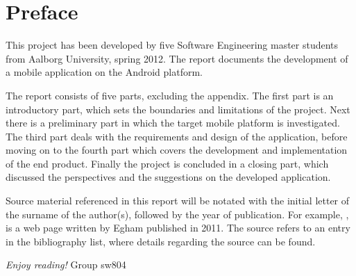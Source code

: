 \newpage
\thispagestyle{empty}
\mbox{}

\chapter*{Preface}
This project has been developed by five Software Engineering master students from Aalborg University, spring 2012. The report documents the development of a mobile application on the Android platform. 

\vspace{4mm}
\noindent The report consists of five parts, excluding the appendix. The first part is an introductory part, which sets the boundaries and limitations of the project. Next there is a preliminary part in which the target mobile platform is investigated. The third part deals with the requirements and design of the application, before moving on to the fourth part which covers the development and implementation of the end product. Finally the project is concluded in a closing part, which discussed the perspectives and the suggestions on the developed application.

\vspace{4mm}
\noindent Source material referenced in this report will be notated with the initial letter of the surname of the author(s), followed by the year of publication. For example, \cite{misc:Gartner}, is a web page written by Egham published in 2011. The source refers to an entry in the bibliography list, where details regarding the source can be found.

\vspace{5mm}
	\begin{flushright}
\emph{Enjoy reading!} Group sw804
	\end{flushright}

\newpage
